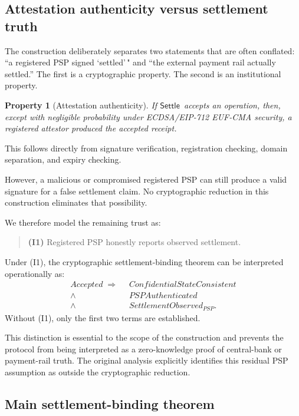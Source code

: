 \documentclass[10pt,twocolumn]{article}
\newtheorem{property}{Property}
\newcommand{\Settle}{\ensuremath{\mathsf{Settle}}}
\begin{document}
\subsection{Attestation authenticity versus settlement truth}

The construction deliberately separates two statements that are often
conflated: ``a registered PSP signed `settled'\," and ``the external
payment rail actually settled.'' The first is a cryptographic property.
The second is an institutional property.

\begin{property}[Attestation authenticity]
If \Settle\ accepts an operation, then, except with negligible
probability under ECDSA/EIP-712 EUF-CMA security, a registered attestor
produced the accepted receipt.
\end{property}

This follows directly from signature verification, registration
checking, domain separation, and expiry checking.

However, a malicious or compromised registered PSP can still produce a
valid signature for a false settlement claim. No cryptographic reduction
in this construction eliminates that possibility.

We therefore model the remaining trust as:
\begin{quote}
\small
\textbf{(I1)} Registered PSP honestly reports observed settlement.
\end{quote}
Under (I1), the cryptographic settlement-binding theorem can be
interpreted operationally as:
\[
\begin{aligned}
\mathit{Accepted} \;\Rightarrow\;\; &\mathit{ConfidentialStateConsistent} \\
\wedge\;\; &\mathit{PSPAuthenticated} \\
\wedge\;\; &\mathit{SettlementObserved}_{PSP}.
\end{aligned}
\]
Without (I1), only the first two terms are established.

This distinction is essential to the scope of the construction and
prevents the protocol from being interpreted as a zero-knowledge proof of
central-bank or payment-rail truth. The original analysis explicitly
identifies this residual PSP assumption as outside the cryptographic
reduction.

\subsection{Main settlement-binding theorem}
\end{document}
